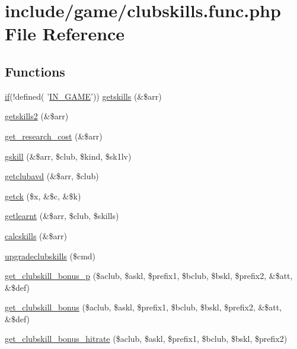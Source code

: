\hypertarget{clubskills_8func_8php}{\section{include/game/clubskills.func.\+php File Reference}
\label{clubskills_8func_8php}
}
\subsection*{Functions}
\begin{DoxyCompactItemize}
\item 
\hyperlink{login__old_8php_a4ac1118c2e44c513a674bc1793ba6c90}{if}(!defined( '\hyperlink{templates_2install_8php_a12c82f3d28569a3f80804f1e72cef14c}{I\+N\+\_\+\+G\+A\+M\+E}')) \hyperlink{clubskills_8func_8php_a74138908b8c6b68733f93cf65dd5f7cb}{getskills} (\&\$arr)
\item 
\hyperlink{clubskills_8func_8php_afc152f422903222f2ffba03cf5cf0b48}{getskills2} (\&\$arr)
\item 
\hyperlink{clubskills_8func_8php_af5eecc29dfb8268f6adfa1b229b3cff1}{get\+\_\+research\+\_\+cost} (\&\$arr)
\item 
\hyperlink{clubskills_8func_8php_a9f2154e4b2b059edfd84191574862890}{gskill} (\&\$arr, \$club, \$kind, \$sk1lv)
\item 
\hyperlink{clubskills_8func_8php_ac158bc5c5b4a427cafab1536de423e30}{getclubavd} (\&\$arr, \$club)
\item 
\hyperlink{clubskills_8func_8php_aeb4f46a5f97ffd6475d662b75f116c30}{getck} (\$x, \&\$c, \&\$k)
\item 
\hyperlink{clubskills_8func_8php_a9c0a722e16e2c1edadf99e631599d544}{getlearnt} (\&\$arr, \$club, \$skills)
\item 
\hyperlink{clubskills_8func_8php_aab3fe95506169112b81d496c09b62709}{calcskills} (\&\$arr)
\item 
\hyperlink{clubskills_8func_8php_a2273bcb3aabde7c447eef97539f53b67}{upgradeclubskills} (\$cmd)
\item 
\hyperlink{clubskills_8func_8php_aff3280cc43f99dc38729d40c5339adb9}{get\+\_\+clubskill\+\_\+bonus\+\_\+p} (\$aclub, \$askl, \$prefix1, \$bclub, \$bskl, \$prefix2, \&\$att, \&\$def)
\item 
\hyperlink{clubskills_8func_8php_a5c57c2cc276b45bdddccf7f853f4bd42}{get\+\_\+clubskill\+\_\+bonus} (\$aclub, \$askl, \$prefix1, \$bclub, \$bskl, \$prefix2, \&\$att, \&\$def)
\item 
\hyperlink{clubskills_8func_8php_a0e6179bdbac634080529b04499809deb}{get\+\_\+clubskill\+\_\+bonus\+\_\+hitrate} (\$aclub, \$askl, \$prefix1, \$bclub, \$bskl, \$prefix2)

\end{DoxyCompactItemize}
